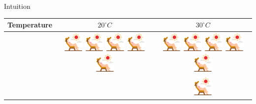 \documentclass[aspectratio=169]{beamer}
\begin{document}
\begin{frame}[allowframebreaks]{Intuition}
  \begin{tabular}{|l|c|c|}
    \hline
    Temperature &  $20^{\circ} C$ & $30^{\circ} C$  \\
    \hline
    &
    \includegraphics[width = 1cm]{../figures/tanning}
    \includegraphics[width = 1cm]{../figures/tanning}
    \includegraphics[width = 1cm]{../figures/tanning}
    \includegraphics[width = 1cm]{../figures/tanning}
    \includegraphics[width = 1cm]{../figures/tanning}
    &
    \includegraphics[width = 1cm]{../figures/tanning}
    \includegraphics[width = 1cm]{../figures/tanning}
    \includegraphics[width = 1cm]{../figures/tanning}
    \includegraphics[width = 1cm]{../figures/tanning}
    \includegraphics[width = 1cm]{../figures/tanning} \\
    & &
    \includegraphics[width = 1cm]{../figures/tanning}

\end{tabular}
\end{frame}
\end{document}
